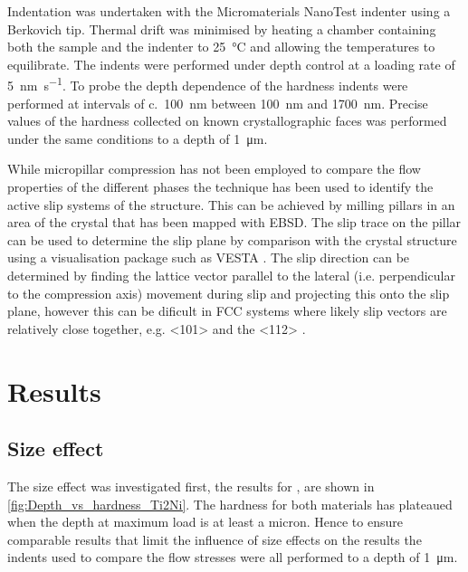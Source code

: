 Indentation was undertaken with the Micromaterials NanoTest indenter using a Berkovich tip. Thermal drift was minimised by heating a chamber containing both the sample and the indenter to \SI{25}{\celsius} and allowing the temperatures to equilibrate. The indents were performed under depth control at a loading rate of \SI{5}{\nano\meter\per\second}. To probe the depth dependence of the hardness indents were performed at intervals of c.~\SI{100}{\nano\meter} between \SI{100}{\nano\meter} and \SI{1700}{\nano\meter}. Precise values of the hardness collected on known crystallographic faces was performed under the same conditions to a depth of \SI{1}{\micro\meter}.


While micropillar compression has not been employed to compare the flow properties of the different phases the technique has been used to identify the active slip systems of the  structure. This can be achieved by milling pillars in an area of the crystal that has been mapped with EBSD. The slip trace on the pillar can be used to determine the slip plane by comparison with the crystal structure using a visualisation package such as VESTA \cite{Momma2011,Davis2015}. The slip direction can be determined by finding the lattice vector parallel to the lateral (i.e. perpendicular to the compression axis) movement during slip and projecting this onto the slip plane, however this can be dificult in FCC systems where likely slip vectors are relatively close together, e.g. <101> and the <112> \cite{Davis2015}.


\section{Results}


\subsection{Size effect}


The size effect was investigated first, the results for ,  are shown in \autoref{fig:Depth_vs_hardness_Ti2Ni}. The hardness for both materials has plateaued when the depth at maximum load is at least a micron. Hence to ensure comparable results that limit the influence of size effects on the results the indents used to compare the flow stresses were all performed to a depth of \SI{1}{\micro\meter}. 

